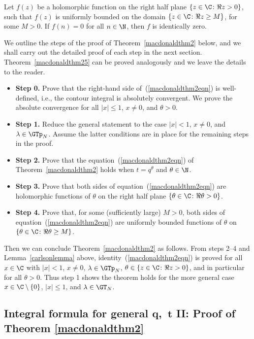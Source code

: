 \begin{lem}\label{carlsonlemma}
Let $f(z)$ be a holomorphic function on the right half plane $\{z\in\C\colon \Re z > 0\}$, such that $f(z)$ is uniformly bounded on the domain $\{z\in\C \colon \Re z \geq M\}$, for some $M>0$. If $f(n) = 0$ for all $n\in\N$, then $f$ is identically zero.
\end{lem}

We outline the steps of the proof of Theorem~\ref{macdonaldthm2} below, and we shall carry out the detailed proof of each step in the next section. Theorem~\ref{macdonaldthm25} can be proved analogously and we leave the details to the reader.
\begin{itemize}\itemsep=0pt
	\item \textbf{Step 0.} Prove that the right-hand side of~(\ref{macdonaldthm2eqn}) is well-def\/ined, i.e., the contour integral is absolutely convergent. We prove the absolute convergence for all $|x|\leq 1$, $x\neq 0$, and $\theta>0$.
	\item \textbf{Step 1.} Reduce the general statement to the case $|x| < 1$, $x\neq 0$, and $\lambda\in\GTp_N$. Assume the latter conditions are in place for the remaining steps in the proof.
	\item \textbf{Step 2.} Prove that the equation~(\ref{macdonaldthm2eqn}) of Theorem~\ref{macdonaldthm2} holds when $t = q^{\theta}$ and $\theta\in\N$.
	\item \textbf{Step 3.} Prove that both sides of equation~(\ref{macdonaldthm2eqn}) are holomorphic functions of $\theta$ on the right half plane $\{\theta\in\C\colon \Re\theta > 0\}$.
	\item \textbf{Step 4.} Prove that, for some (suf\/f\/iciently large) $M > 0$, both sides of equation~(\ref{macdonaldthm2eqn}) are uniformly bounded functions of $\theta$ on $\{\theta\in\C\colon \Re\theta \geq M\}$.
\end{itemize}

Then we can conclude Theorem~\ref{macdonaldthm2} as follows. From steps 2--4 and Lemma~\ref{carlsonlemma} above, identity~(\ref{macdonaldthm2eqn}) is proved for all $x\in\C$ with $|x| < 1$, $x\neq 0$, $\lambda\in\GTp_N$, $\theta\in\{z\in\C \colon \Re z > 0\}$, and in particular for all $\theta > 0$. Thus step 1 shows the theorem holds for the more general case $x\in\C \setminus \{0\}$, $|x|\leq 1$, and $\lambda\in\GT_N$.


\subsection[Integral formula for general $q$,~$t$ II: Proof of Theorem \ref{macdonaldthm2}]{Integral formula for general $\boldsymbol{q}$,~$\boldsymbol{t}$ II: Proof of Theorem \ref{macdonaldthm2}}


